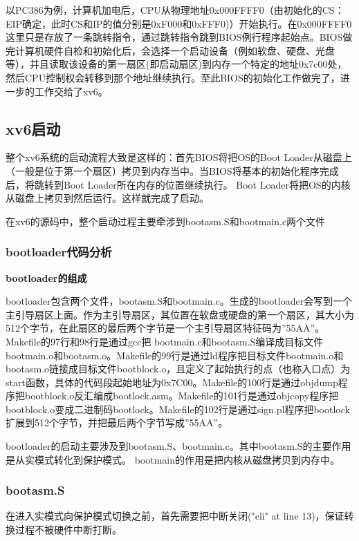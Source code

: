 以PC386为例，计算机加电后，CPU从物理地址0x000FFFF0（由初始化的CS：EIP确定，此时CS和IP的值分别是0xF000和0xFFF0)）开始执行。在0x000FFFF0这里只是存放了一条跳转指令，通过跳转指令跳到BIOS例行程序起始点。BIOS做完计算机硬件自检和初始化后，会选择一个启动设备（例如软盘、硬盘、光盘等），并且读取该设备的第一扇区(即启动扇区)到内存一个特定的地址0x7c00处，然后CPU控制权会转移到那个地址继续执行。至此BIOS的初始化工作做完了，进一步的工作交给了xv6。

\subsection{xv6启动}

整个xv6系统的启动流程大致是这样的：首先BIOS将把OS的Boot Loader从磁盘上（一般是位于第一个扇区）拷贝到内存当中。当BIOS将基本的初始化程序完成后，将跳转到Boot Loader所在内存的位置继续执行。 Boot Loader将把OS的内核从磁盘上拷贝到然后运行。这样就完成了启动。

在xv6的源码中，整个启动过程主要牵涉到bootasm.S和bootmain.c两个文件

\subsubsection{bootloader代码分析}

\textbf{bootloader的组成}


bootloader包含两个文件，bootasm.S和bootmain.c。生成的bootloader会写到一个主引导扇区上面。作为主引导扇区，其位置在软盘或硬盘的第一个扇区，其大小为512个字节，在此扇区的最后两个字节是一个主引导扇区特征码为”55AA”。Makefile的97行和98行是通过gcc把 bootmain.c和bootasm.S编译成目标文件bootmain.o和bootasm.o。Makefile的99行是通过ld程序把目标文件bootmain.o和bootasm.o链接成目标文件bootblock.o，且定义了起始执行的点（也称入口点）为start函数，具体的代码段起始地址为0x7C00。Makefile的100行是通过objdump程序把bootblock.o反汇编成bootlock.asm。Makefile的101行是通过objcopy程序把bootblock.o变成二进制码bootlock。Makefile的102行是通过sign.pl程序把bootlock扩展到512个字节，并把最后两个字节写成”55AA”。

bootloader的启动主要涉及到bootasm.S、bootmain.c。其中bootasm.S的主要作用是从实模式转化到保护模式。 bootmain的作用是把内核从磁盘拷贝到内存中。

\subsubsection{bootasm.S}

在进入实模式向保护模式切换之前，首先需要把中断关闭("cli" at line 13)，保证转换过程不被硬件中断打断。

